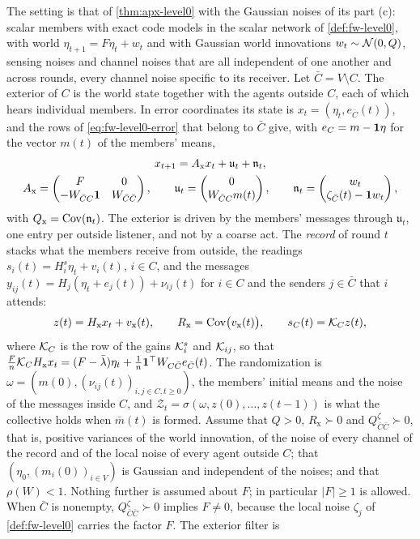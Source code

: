 The setting is that of \cref{thm:apx-level0} with the Gaussian noises of its part (c): scalar members with exact code models in the scalar network of \cref{def:fw-level0}, with world $\eta_{t+1}=F\eta_t+w_t$ and with Gaussian world innovations $w_t\sim\mathcal{N}(0,Q)$, sensing noises and channel noises that are all independent of one another and across rounds, every channel noise specific to its receiver. Let $\bar C=V\setminus C$. The exterior of $C$ is the world state together with the agents outside $C$, each of which hears individual members. In error coordinates its state is $x_t=(\eta_t,e_{\bar C}(t))$, and the rows of \eqref{eq:fw-level0-error} that belong to $\bar C$ give, with $e_C=m-\mathbf{1}\eta$ for the vector $m(t)$ of the members' means,
\begin{equation}\label{eq:apx-level0-exterior}
\begin{gathered}
x_{t+1}=A_{\mathrm x}x_t+\mathfrak u_t+\mathfrak n_t,\\
A_{\mathrm x}=\begin{pmatrix}F&0\\-W_{\bar CC}\mathbf{1}&W_{\bar C\bar C}\end{pmatrix},\qquad\mathfrak u_t=\begin{pmatrix}0\\W_{\bar CC}m(t)\end{pmatrix},\qquad\mathfrak n_t=\begin{pmatrix}w_t\\\zeta_{\bar C}(t)-\mathbf{1} w_t\end{pmatrix},
\end{gathered}
\end{equation}
with $Q_{\mathrm x}=\operatorname{Cov}(\mathfrak n_t)$. The exterior is driven by the members' messages through $\mathfrak u_t$, one entry per outside listener, and not by a coarse act. The \emph{record} of round $t$ stacks what the members receive from outside, the readings $s_i(t)=H^s_i\eta_t+v_i(t)$, $i\in C$, and the messages $y_{ij}(t)=H_j(\eta_t+e_j(t))+\nu_{ij}(t)$ for $i\in C$ and the senders $j\in\bar C$ that $i$ attends:
\begin{equation}\label{eq:apx-level0-record}
z(t)=H_{\mathrm x}x_t+v_{\mathrm x}(t),\qquad R_{\mathrm x}=\operatorname{Cov}\bigl(v_{\mathrm x}(t)\bigr),\qquad s_C(t)=\mathcal{K}_Cz(t),
\end{equation}
where $\mathcal{K}_C$ is the row of the gains $\mathcal{K}^s_i$ and $\mathcal{K}_{ij}$, so that $\frac Fn\mathcal{K}_CH_{\mathrm x}x_t=(F-\bar\lambda)\eta_t+\frac1n\mathbf{1}^\top W_{C\bar C}e_{\bar C}(t)$. The randomization is $\omega=(m(0),(\nu_{ij}(t))_{i,j\in C,t\ge0})$, the members' initial means and the noise of the messages inside $C$, and $\mathcal Z_t=\sigma(\omega,z(0),\dots,z(t-1))$ is what the collective holds when $\bar m(t)$ is formed. Assume that $Q>0$, $R_{\mathrm x}\succ0$ and $Q^\zeta_{\bar C\bar C}\succ0$, that is, positive variances of the world innovation, of the noise of every channel of the record and of the local noise of every agent outside $C$; that $(\eta_0,(m_i(0))_{i\in V})$ is Gaussian and independent of the noises; and that $\rho(W)<1$. Nothing further is assumed about $F$; in particular $\lvert F\rvert\ge1$ is allowed. When $\bar C$ is nonempty, $Q^\zeta_{\bar C\bar C}\succ0$ implies $F\ne0$, because the local noise $\zeta_j$ of \cref{def:fw-level0} carries the factor $F$. The exterior filter is
